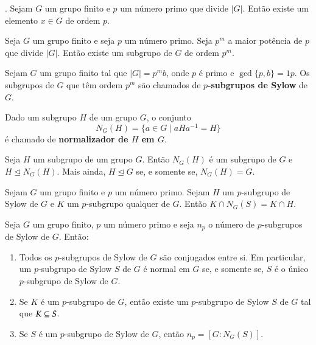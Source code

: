\begin{corolario}.
	Sejam $G$ um grupo finito e $p$ um n\'umero primo que divide $|G|$. Ent\~ao existe um elemento $x \in G$ de ordem $p$.
\end{corolario}

\begin{corolario}
	Seja $G$ um grupo finito e seja $p$ um n\'umero primo. Seja $p^m$ a maior pot\^encia de $p$ que divide $|G|$. Ent\~ao existe um subgrupo de $G$ de ordem $p^m$.
\end{corolario}

\begin{definicao}
Sejam $G$ um grupo finito tal que $|G| =
p^m b$, onde $p$ {\'e} primo e $\gcd\{p, b\} = 1p$. Os subgrupos de $G$ que t\^em ordem $p^m$ s\~ao chamados de
\textbf{$p$-subgrupos de Sylow} de $G$.
\end{definicao}

\begin{definicao}
	Dado um subgrupo $H$ de um grupo $G$, o conjunto
	\[
		N_G(H) = \{a \in G \mid aHa^{-1} = H\}
	\]
	\'e chamado de \textbf{normalizador de $H$ em $G$}.
\end{definicao}

\begin{proposicao}
	Seja $H$ um subgrupo de um grupo $G$. Ent\~ao $N_G(H)$ \'e um subgrupo de $G$ e $H \unlhd N_G(H)$. Mais ainda, $H \unlhd G$ se, e somente se, $N_G(H) = G$.
\end{proposicao}

\begin{lema}
	Sejam $G$ um grupo finito e $p$ um n\'umero primo. Sejam $H$ um $p$-subgrupo de Sylow de $G$ e $K$ um $p$-subgrupo qualquer de $G$. Ent\~ao $K \cap N_G(S) = K \cap H$.
\end{lema}

\begin{teorema}
	Seja $G$ um grupo finito, $p$ um n\'umero primo e seja $n_p$ o n\'umero de $p$-subgrupos de Sylow de $G$. Ent\~ao:
	\begin{enumerate}[label=({\roman*})]
		\item Todos os $p$-subgrupos de Sylow de $G$ s\~ao conjugados entre si. Em particular, um $p$-subgrupo de Sylow $S$ de $G$ \'e normal em $G$ se, e somente se, $S$ \'e o \'unico $p$-subgrupo de Sylow de $G$.

		\item Se $K$ \'e um $p$-subgrupo de $G$, ent\~ao existe um $p$-subgrupo de Sylow $S$ de $G$ tal que $K \subseteq S$.

		\item Se $S$ \'e um $p$-subgrupo de Sylow de $G$, ent\~ao $n_p = [G : N_G(S)]$.
	\end{enumerate}
\end{teorema}

